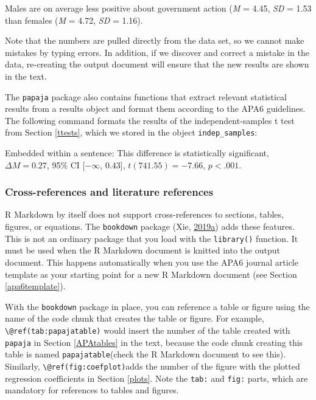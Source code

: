 \documentclass[doc,floatsintext]{apa6}
\newenvironment{Shaded}{\begin{snugshade}}{\end{snugshade}}
\newcommand{\DataTypeTok}[1]{\textcolor[rgb]{0.13,0.29,0.53}{#1}}
\newcommand{\StringTok}[1]{\textcolor[rgb]{0.31,0.60,0.02}{#1}}
\begin{document}
Males are on average less positive about government action (\emph{M} =
4.45, \emph{SD} = 1.53 than females (\emph{M} = 4.72, \emph{SD} = 1.16).

Note that the numbers are pulled directly from the data set, so we
cannot make mistakes by typing errors. In addition, if we discover and
correct a mistake in the data, re-creating the output document will
ensure that the new results are shown in the text.

The \texttt{papaja} package also contains functions that extract
relevant statistical results from a results object and format them
according to the APA6 guidelines. The following command formats the
results of the independent-samples t test from Section \ref{ttests},
which we stored in the object \texttt{indep\_samples}:

\begin{Shaded}
\end{Shaded}

Embedded within a sentence: This difference is statistically
significant, \(\Delta M = 0.27\), 95\% CI \([-\infty\), \(0.43]\),
\(t(741.55) = -7.66\), \(p < .001\).

\subsubsection{Cross-references and literature
references}\label{crossreferences}

R Markdown by itself does not support cross-references to sections,
tables, figures, or equations. The \texttt{bookdown} package (Xie,
\protect\hyperlink{ref-R-bookdown}{2019}\protect\hyperlink{ref-R-bookdown}{a})
adds these features. This is not an ordinary package that you load with
the \texttt{library()} function. It must be used when the R Markdown
document is knitted into the output document. This happens automatically
when you use the APA6 journal article template as your starting point
for a new R Markdown document (see Section \ref{apa6template}).

With the \texttt{bookdown} package in place, you can reference a table
or figure using the name of the code chunk that creates the table or
figure. For example, \texttt{\textbackslash{}@ref(tab:papajatable)}
would insert the number of the table created with \texttt{papaja} in
Section \ref{APAtables} in the text, because the code chunk creating
this table is named \texttt{papajatable}(check the R Markdown document
to see this). Similarly, \texttt{\textbackslash{}@ref(fig:coefplot)}adds
the number of the figure with the plotted regression coefficients in
Section \ref{plots}. Note the \texttt{tab:} and \texttt{fig:} parts,
which are mandatory for references to tables and figures.
\end{document}
